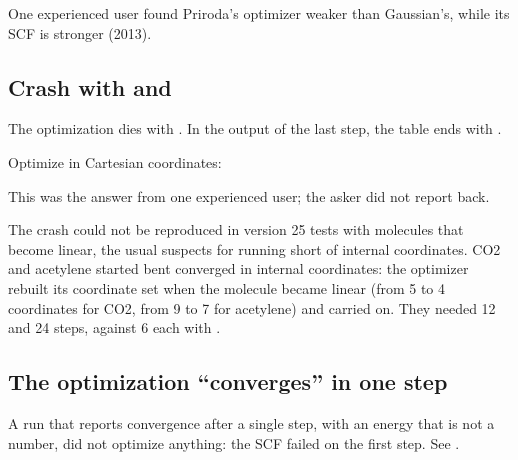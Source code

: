 \documentclass[letterpaper,10pt,english,openany,oneside]{sphinxmanual}
\begin{document}
\sphinxAtStartPar
One experienced user found Priroda’s optimizer weaker than Gaussian’s, while its SCF is stronger (2013).




\subsection{Crash with  and }
\label{\detokenize{troubleshooting/common-problems:crash-with-process-0-got-signal-6-and-too-few}}
\sphinxAtStartPar
{} The optimization dies with . In the output of the last step, the
 table ends with .

\sphinxAtStartPar
{} Optimize in Cartesian coordinates:

\begin{sphinxVerbatim}[commandchars=\\\{\}]
\end{sphinxVerbatim}

\sphinxAtStartPar
This was the answer from one experienced user; the asker did not report back.



\sphinxAtStartPar
The crash could not be reproduced in version 25 tests with molecules that become linear, the usual suspects for
running short of internal coordinates. CO2 and acetylene started bent converged in internal coordinates: the
optimizer rebuilt its coordinate set when the molecule became linear (from 5 to 4 coordinates for CO2, from 9 to 7
for acetylene) and carried on. They needed 12 and 24 steps, against 6 each with .




\subsection{The optimization “converges” in one step}
\label{\detokenize{troubleshooting/common-problems:the-optimization-converges-in-one-step}}
\sphinxAtStartPar
A run that reports convergence after a single step, with an energy that is not a number, did not optimize anything:
the SCF failed on the first step. See {\hyperref[\detokenize{troubleshooting/common-problems:troubleshooting-nan}]{}}.
\end{document}
